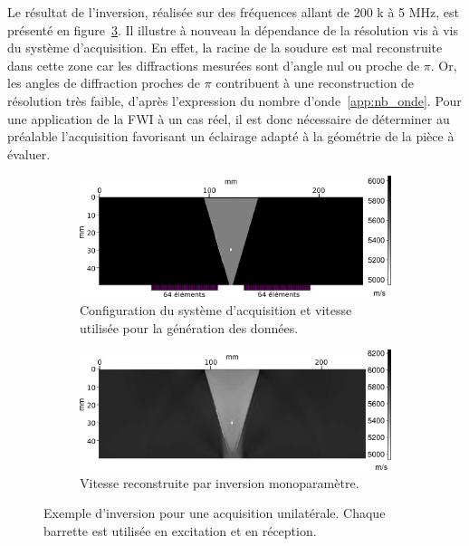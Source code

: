  Le résultat de l'inversion, réalisée sur des fréquences allant de 200 k à 5 MHz, est présenté en figure~\ref{app:iso:reel2}. Il illustre à nouveau la dépendance de la résolution vis à vis du système d'acquisition. En effet, la racine de la soudure est mal reconstruite dans cette zone car les diffractions mesurées sont d'angle nul ou proche de $\pi$. Or, les angles de diffraction proches de $\pi$  contribuent à une reconstruction de résolution très faible, d'après l'expression du nombre d'onde~\ref{app:nb_onde}. Pour une application de la FWI à un cas réel, il est donc nécessaire de déterminer au préalable l'acquisition favorisant un éclairage adapté à la géométrie de la pièce à évaluer.
 
\begin{figure}
	\begin{subfigure}[b]{0.5\textwidth}
		\centering
		\includegraphics[width=\textwidth]{img/config_reelle_true.png}
		\caption{Configuration du système d'acquisition et vitesse utilisée pour la génération des données.\label{app:iso:reel1}}	
	\end{subfigure}
	\hspace{0.2cm}
	\begin{subfigure}[b]{0.5\textwidth}
		\centering
		\includegraphics[width=\textwidth]{img/config_reelle_rec.png}
		\caption{Vitesse reconstruite par inversion monoparamètre. \label{app:iso:reel2}}	
	\end{subfigure}
	\caption{Exemple d'inversion pour une acquisition unilatérale. Chaque barrette est utilisée en excitation et en réception.}
\end{figure}

